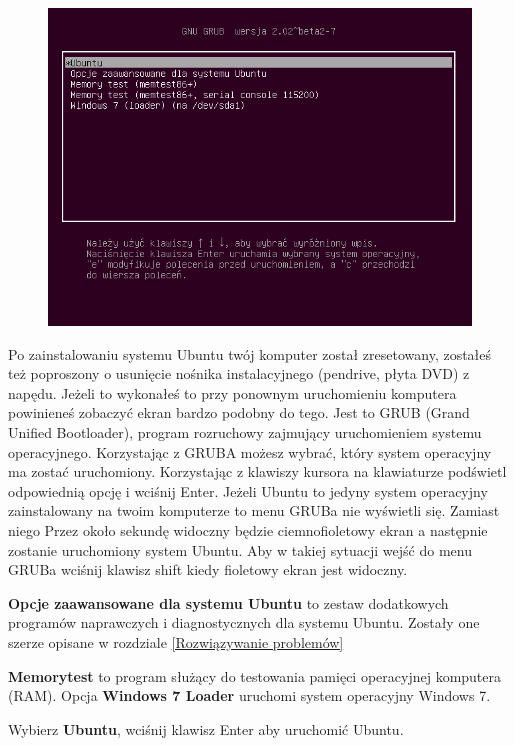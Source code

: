 \begin{figure}
                \includegraphics[width=\linewidth]{images/pierwsze_uruchomienie_grub.png}
\end{figure}

Po zainstalowaniu systemu Ubuntu twój komputer został zresetowany, zostałeś też poproszony o usunięcie nośnika instalacyjnego (pendrive, płyta DVD) z napędu. Jeżeli to wykonałeś to przy ponownym uruchomieniu komputera powinieneś zobaczyć ekran bardzo podobny do tego. Jest to GRUB (Grand Unified Bootloader), program rozruchowy zajmujący uruchomieniem systemu operacyjnego. Korzystając z GRUBA możesz wybrać, który system operacyjny ma zostać uruchomiony. Korzystając z klawiszy kursora na klawiaturze podświetl odpowiednią opcję i wciśnij Enter.
Jeżeli Ubuntu to jedyny system operacyjny zainstalowany na twoim komputerze to menu GRUBa nie wyświetli się. Zamiast niego Przez około sekundę widoczny będzie ciemnofioletowy ekran a następnie zostanie uruchomiony system Ubuntu. Aby w takiej sytuacji wejść do menu GRUBa wciśnij klawisz shift kiedy fioletowy ekran jest widoczny.

\textbf{Opcje zaawansowane dla systemu Ubuntu} to zestaw dodatkowych programów naprawczych i diagnostycznych dla systemu Ubuntu. Zostały one szerze opisane w rozdziale \ref{Rozwiązywanie problemów}

\textbf{Memorytest} to program służący do testowania pamięci operacyjnej komputera (RAM).
Opcja \textbf{Windows 7 Loader} uruchomi system operacyjny Windows 7.

\begin{flushright}
Wybierz \textbf{Ubuntu}, wciśnij klawisz Enter aby uruchomić Ubuntu.
\end{flushright}
\clearpage
